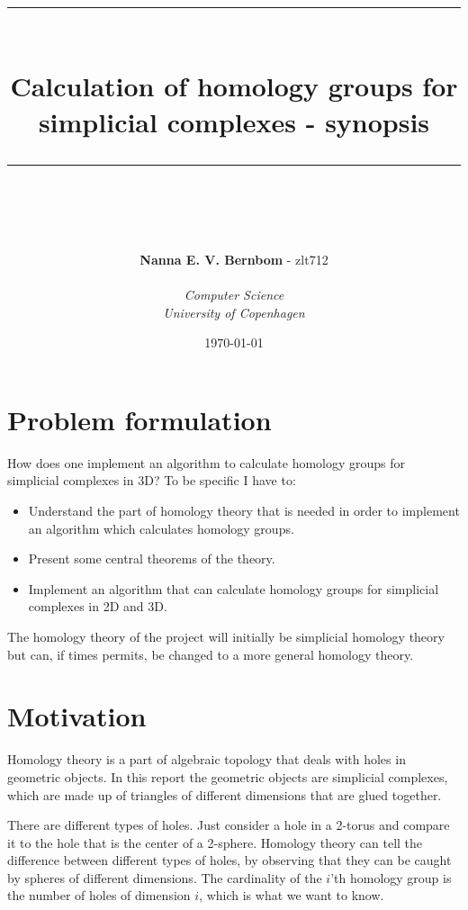 \documentclass[11pt]{article}
\newcommand{\HRule}{\rule{\linewidth}{0.5mm}}
\begin{document}
\begin{titlepage}
\title{\HRule \\[0.4cm]
\textbf{Calculation of homology groups for simplicial complexes - synopsis}\\
\HRule \\[0.4cm]}
\author{\textbf{Nanna E. V. Bernbom} - zlt712\\\\
\textit{Computer Science}\\
\textit{University of Copenhagen}}
\date{\today}

\maketitle
\thispagestyle{empty}
\end{titlepage}

\newpage
\section*{Problem formulation}
How does one implement an algorithm to calculate homology groups for simplicial complexes in 3D? 
To be specific I have to:
\begin{itemize}
\item Understand the part of homology theory that is needed in order to implement an algorithm which calculates homology groups.
\item Present some central theorems of the theory.
\item Implement an algorithm that can calculate homology groups for simplicial complexes in 2D and 3D.
\end{itemize}

The homology theory of the project will initially be simplicial homology theory but can, if times permits, be changed to a more general homology theory.

\section*{Motivation}
Homology theory is a part of algebraic topology that deals with holes in geometric objects. In this report the geometric objects are simplicial complexes, which are made up of triangles of different dimensions that are glued together.

There are different types of holes. Just consider a hole in a 2-torus and compare it to the hole that is the center of a 2-sphere. Homology theory can tell the difference between different types of holes, by observing that they can be caught by spheres of different dimensions. The cardinality of the $i$'th homology group is the number of holes of dimension $i$, which is what we want to know.
\end{document}
